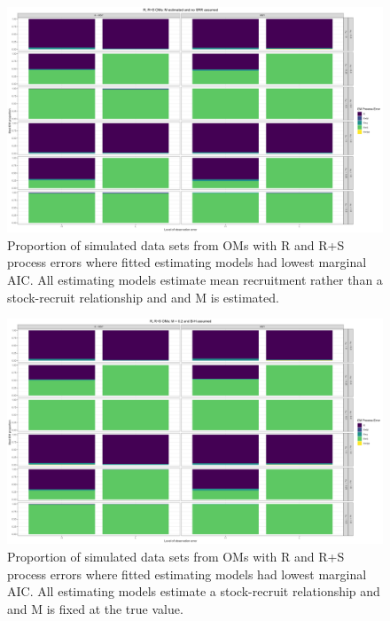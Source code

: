\documentclass[
  12pt,
]{article}
\begin{document}
\begin{landscape}
\begin{figure}
\caption{Proportion of simulated data sets from OMs with R and R+S process errors where fitted estimating models had lowest marginal AIC. All estimating models estimate mean recruitment rather than a stock-recruit relationship and and M is estimated.} \label{naa_om_proportion_best_aic_R_ME}
\begin{center}
\includegraphics[width = \textwidth]{naa_om_proportion_best_aic_R_ME.png}
\end{center}
\end{figure}
\end{landscape}

\begin{landscape}
\begin{figure}
\caption{Proportion of simulated data sets from OMs with R and R+S process errors where fitted estimating models had lowest marginal AIC. All estimating models estimate a stock-recruit relationship and and M is fixed at the true value.} \label{naa_om_proportion_best_aic_SR_MF}
\begin{center}
\includegraphics[width = \textwidth]{naa_om_proportion_best_aic_SR_MF.png}
\end{center}
\end{figure}
\end{landscape}
\end{document}
